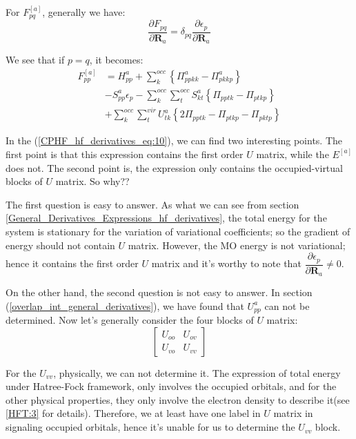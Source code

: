 For $F^{[a]}_{pq}$, generally we have:
\begin{equation}
  \label{CPHF_hf_derivatives_eq:9}
  \frac{\partial F_{pq}}{\partial \bm{R}_{a}} = \delta_{pq}
  \frac{\partial \epsilon_{p}}{\partial \bm{R}_{a}}
\end{equation}

We see that if $p=q$, it becomes:
\begin{align}
  \label{CPHF_hf_derivatives_eq:10}
  F_{pp}^{[a]} &= H^{a}_{pp} + \sum_{k}^{occ}\left \{\Pi^{a}_{ppkk} -
    \Pi^{a}_{pkkp} \right\}
  \nonumber \\
  &- S^{a}_{pp}\epsilon_{p} - \sum_{k}^{occ}\sum_{t}^{occ}S^{a}_{kt}
  \left\{ \Pi_{pptk} - \Pi_{ptkp} \right\} \nonumber \\
  &+ \sum_{k}^{occ}\sum_{t}^{vir}U^{a}_{tk}\left\{ 2\Pi_{pptk} -
    \Pi_{ptkp} - \Pi_{pktp} \right\}
\end{align}

In the (\ref{CPHF_hf_derivatives_eq:10}), we can find two interesting
points. The first point is that this expression contains the first
order $U$ matrix, while the $E^{[a]}$ does not. The second point is,
the expression only contains the occupied-virtual blocks of $U$
matrix. So why??

The first question is easy to answer. As what we can see from section
\ref{General_Derivatives_Expressions_hf_derivatives}, the total energy
for the system is stationary for the variation of variational
coefficients; so the gradient of energy should not contain $U$
matrix. However, the MO energy is not variational; hence it contains
the first order $U$ matrix and it's worthy to note that
$\dfrac{\partial \epsilon_{p}}{\partial \bm{R}_{a}} \neq 0$.

On the other hand, the second question is not easy to answer. In
section (\ref{overlap_int_general_derivatives}), we have found that
$U^{a}_{pp}$ can not be determined. Now let's generally consider the
four blocks of $U$ matrix:
\begin{equation}
  \label{CPHF_hf_derivatives_eq:11}
  \begin{bmatrix}
    U_{oo} & U_{ov} \\
    U_{vo} & U_{vv}
  \end{bmatrix}
\end{equation}

For the $U_{vv}$, physically, we can not determine it. The expression
of total energy under Hatree-Fock framework, only involves the
occupied orbitals, and for the other physical properties, they only
involve the electron density to describe it(see \ref{HFT:3} for
details). Therefore, we at least have one label in $U$ matrix in signaling
occupied orbitals, hence it's unable for us to determine the $U_{vv}$ block.

